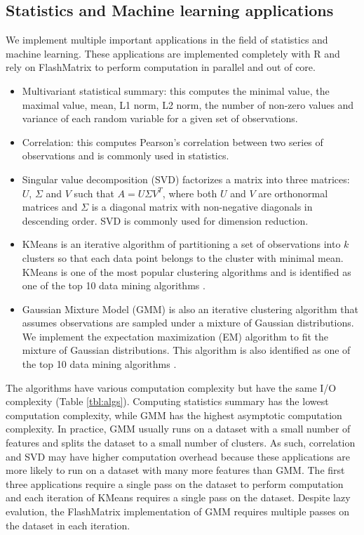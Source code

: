 \subsection{Statistics and Machine learning applications} \label{sec:apps}
We implement multiple important applications in the field of statistics and
machine learning. These applications are implemented completely with R and
rely on FlashMatrix to perform computation in parallel and out of core.
\begin{itemize}
	\item Multivariant statistical summary: this computes the minimal value,
		the maximal value, mean, L1 norm, L2 norm, the number of non-zero values
		and variance of each random variable for a given set of observations.
	\item Correlation: this computes Pearson's correlation \cite{} between
		two series of observations and is commonly used in statistics.
	\item Singular value decomposition (SVD) \cite{} factorizes a matrix into
		three matrices: $U$, $\Sigma$ and $V$ such that $A=U \Sigma V^T$, where
		both $U$ and $V$ are orthonormal matrices and $\Sigma$ is a diagonal
		matrix with non-negative diagonals in descending order. SVD is commonly
		used for dimension reduction.
	\item KMeans \cite{kmeans} is an iterative algorithm of partitioning a set
		of observations into $k$ clusters
		so that each data point belongs to the cluster with minimal mean. KMeans
		is one of the most popular clustering algorithms and is identified as
		one of the top 10 data mining algorithms \cite{top10}.
	\item Gaussian Mixture Model (GMM) \cite{gmm} is also an iterative
		clustering algorithm that assumes observations are sampled under
		a mixture of Gaussian distributions. We implement the expectation
		maximization (EM) \cite{em} algorithm to fit
		the mixture of Gaussian distributions. This algorithm is also identified
		as one of the top 10 data mining algorithms \cite{top10}.
\end{itemize}

The algorithms have various computation complexity but have the same I/O
complexity (Table \ref{tbl:algs}). Computing statistics summary
has the lowest computation complexity, while GMM has the highest asymptotic
computation complexity. In practice, GMM usually runs on a dataset with
a small number of features and splits the dataset to a small number of clusters.
As such, correlation and SVD may have higher computation overhead because
these applications are more likely to run on a dataset with many more features
than GMM. The first three applications require a single pass on the dataset
to perform computation and each iteration of KMeans requires a single pass
on the dataset. Despite lazy evalution, the FlashMatrix implementation of
GMM requires multiple passes on the dataset in each iteration.

